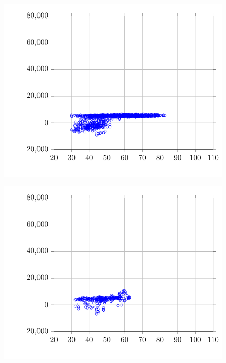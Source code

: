 \begin{figure}
\centering
\includegraphics{Plots/09/2017-06-27-1124-BtuhrvsOADryBulbTemperatureNOAAF.pdf}
\caption{}
\label{fig:2017-06-27-1124-BtuhrvsOADryBulbTemperatureNOAAF}
\end{figure}

\begin{figure}
\centering
\includegraphics{Plots/10/2017-06-27-1131-BtuhrvsOADryBulbTemperatureNOAAF.pdf}
\caption{}
\label{fig:2017-06-27-1131-BtuhrvsOADryBulbTemperatureNOAAF}
\end{figure}

